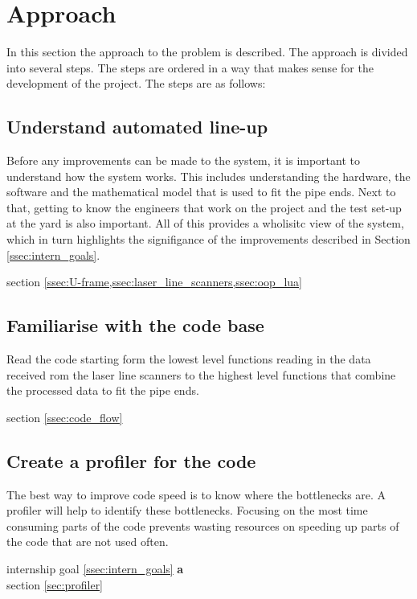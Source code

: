 \section{Approach} \label{sec:approach}
In this section the approach to the problem is described. The approach is divided into several steps.
The steps are ordered in a way that makes sense for the development of the project. The steps are as follows:

\subsection{Understand automated line-up} \label{ssec:understand_lua}
Before any improvements can be made to the system, it is important to understand how the system works.
This includes understanding the hardware, the software and the mathematical model that is used to fit the pipe ends.
Next to that, getting to know the engineers that work on the project and the test set-up at the yard is also important.
All of this provides a wholisitc view of the system, which in turn highlights the signifigance of the improvements described
in Section \ref{ssec:intern_goals}.
\begin{flushright}
    \large{} section \cref{ssec:U-frame,ssec:laser_line_scanners,ssec:oop_lua}
\end{flushright}

\subsection{Familiarise with the code base} \label{ssec:familiarize_code}
Read the code starting form the lowest level functions reading in the data received rom the laser line scanners to
the highest level functions that combine the processed data to fit the pipe ends.
\begin{flushright}
    \large{} section \ref{ssec:code_flow}
\end{flushright}

\subsection{Create a profiler for the code} \label{ssec:profiler}
The best way to improve code speed is to know where the bottlenecks are. A profiler will help to identify these bottlenecks. Focusing
on the most time consuming parts of the code prevents wasting resources on speeding up parts of the code that are not used often.
\begin{flushright}
     internship goal \ref{ssec:intern_goals} \textbf{a}\\
    \large{} section \ref{sec:profiler}
\end{flushright}


